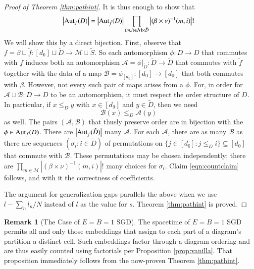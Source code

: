 \documentclass[openany, notitlepage, justified]{tufte-book}
\theoremstyle{plain}
\theoremstyle{definition}
\newtheorem{rmk}{Remark}
\newcommand{\wabs}[1]{\left|#1\right|}
\newcommand{\Aut}{\text{\textnormal{Aut}}}
\newcommand{\Aa}{\mathcal{A}}
\newcommand{\Bb}{\mathcal{B}}
\newcommand{\Mm}{\mathcal{M}}
\begin{document}
\begin{proof}[Proof of Theorem \ref{thm:pathint}]
            It is thus enough to show that
            \begin{align*} \label{eqn:countclaim}
                \wabs{\Aut_f(D)} = 
                \wabs{\Aut_{\tilde f}(D)}
                \prod_{(m, i) \in \Mm \times \tilde D}
                    \wabs{(\beta \times \nu)^{-1}(m, i)}!
            \end{align*}
            We will show this by a direct bijection.  First, observe that
            $
                f = \beta \sqcup \tilde f:
                    [d_0] \sqcup \tilde D \to \Mm \sqcup \tilde S
            $. 
            So each automorphism $\phi: D\to D$ that commutes with $f$ induces
            both an automorphism
            $
                \Aa = \phi|_{\tilde D}: \tilde D\to \tilde D
            $
            that commutes with $\tilde f$ together with the data of a map
            $
                \Bb = \phi_{[d_0]}: [d_0] \to [d_0] 
            $
            that both commutes with $\beta$.  However, not every such pair of
            maps arises from a $\phi$.  For, in order for $\Aa \sqcup \Bb: D
            \to D$ to be an automorphism, it must respect the order structure
            of $D$.  In particular, if $x\leq_D y$ with $x \in [d_0]$ and $y
            \in \tilde D$, then we need
            $$
                \Bb(x) \leq_D \Aa(y)
            $$
            as well.  The
            pairs $(\Aa, \Bb)$ that thusly preserve order are in bijection with
            the $\phi \in \Aut_f(D)$.  There are $\wabs{\Aut_{\tilde f}(\tilde
            D)}$ many $\Aa$.  For each $\Aa$, there are as many $\Bb$ as there
            are sequences $(\sigma_i: i \in \tilde D)$ of permutations on
            $
                \{j\in [d_0]: j\leq_D i\} \subseteq [d_0]
            $ 
            that commute with $\Bb$.  These permutations may be chosen
            independently; there are 
            $
                \prod_{m\in \Mm}
                    \wabs{(\beta \times \nu)^{-1}(m, i)}!
            $
            many choices for $\sigma_i$.  Claim \ref{eqn:countclaim} follows,
            and with it the correctness of coefficients.
 
            The argument for generalization gaps parallels the above when we
            use $l-\sum_n l_n/N$ instead of $l$ as the value for $s$. 
            Theorem \ref{thm:pathint} is proved.
        \end{proof}

        \begin{rmk}[The Case of $E=B=1$ SGD]
            The spacetime of $E=B=1$ SGD permits all and only those
            embeddings that assign to each part of a diagram's partition  a
            distinct cell.  Such embeddings factor through a diagram
            ordering and are thus easily counted using factorials per
            Proposition \ref{prop:vanilla}.  That proposition immediately
            follows from the now-proven Theorem \ref{thm:pathint}.
        \end{rmk}
\end{document}

